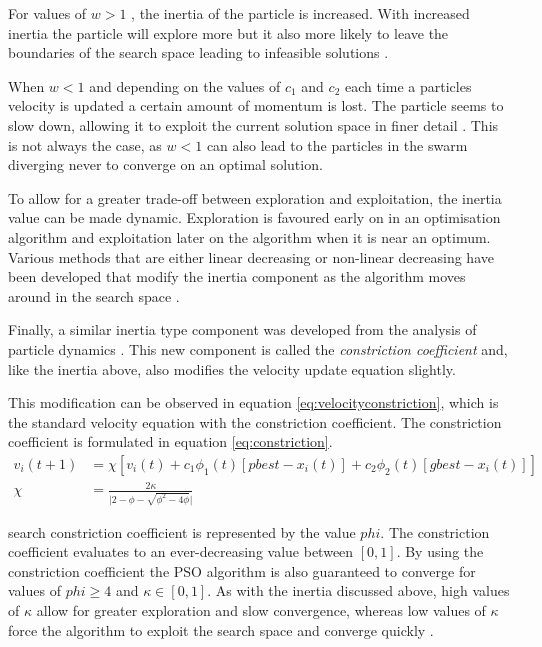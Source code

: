 For values of $w > 1$ , the inertia of the particle is increased. With increased inertia the particle will explore more but it also more likely to leave the boundaries of the search space leading to infeasible solutions \cite{FundamentalSwarm}. 

When $w < 1$ and depending on the values of $c_1$ and $c_2$ each time a particles velocity is updated a certain amount of momentum is lost. The particle seems to slow down, allowing it to exploit the current solution space in finer detail \cite{FundamentalSwarm}. This is not always the case, as $w < 1$ can also lead to the particles in the swarm diverging never to converge on an optimal solution.

To allow for a greater trade-off between exploration and exploitation, the inertia value can be made dynamic. Exploration is favoured early on in an optimisation algorithm and  exploitation later on the algorithm when it is near an optimum. Various methods that are either linear decreasing or non-linear decreasing have been developed that modify the inertia component as the algorithm moves around in the search space \cite{CompuIntelligenceIntro,FundamentalSwarm}.

Finally, a similar inertia type component was developed from the analysis of particle dynamics \cite{FundamentalSwarm}. This new component is called the \emph{constriction coefficient} and, like the inertia above, also modifies the velocity update equation slightly\cite{adaptPSO,FundamentalSwarm,CompuIntelligenceIntro}. 

This modification can be observed in equation \ref{eq:velocityconstriction}, which is the standard velocity equation with the constriction coefficient. The constriction coefficient is formulated in equation \ref{eq:constriction}\cite{adaptPSO,FundamentalSwarm,CompuIntelligenceIntro}.
\begin{align}
v_i(t+1) &= \chi[v_i(t) + c_1\phi_{1}(t)[pbest - x_i(t)] + c_2\phi_{2}(t)[gbest - x_i(t)]]\label{eq:velocityconstriction}\\
\chi &= \frac{2\kappa}{\lvert 2 - \phi - \sqrt{\phi^2 - 4\phi}\rvert}\label{eq:constriction}
\end{align}

search constriction coefficient is represented by the value $phi$. The constriction coefficient evaluates to an ever-decreasing value between $[0,1]$. By using the constriction coefficient the \gls{PSO} algorithm is also guaranteed to converge for values of $phi \geq 4$ and $\kappa \in [0,1]$. As with the inertia discussed above, high values of $\kappa$ allow for greater exploration and slow convergence, whereas low values of $\kappa$ force the algorithm to exploit the search space and converge quickly \cite{adaptPSO,FundamentalSwarm,CompuIntelligenceIntro}.

